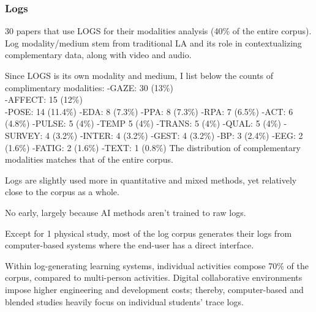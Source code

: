 \documentclass[manuscript,screen,review]{acmart}
\begin{document}
\subsubsection{Logs}
30 papers that use LOGS for their modalities analysis (40\% of the entire corpus). Log modality/medium stem from traditional LA and its role in contextualizing complementary data, along with video and audio.

Since LOGS is its own modality and medium, I list below the counts of complimentary modalities:
-GAZE: 30 (13\%)\\
-AFFECT: 15 (12\%)\\
-POSE: 14 (11.4\%)
-EDA: 8 (7.3\%)
-PPA: 8 (7.3\%)
-RPA: 7 (6.5\%)
-ACT: 6 (4.8\%)
-PULSE: 5 (4\%)
-TEMP 5 (4\%)
-TRANS: 5 (4\%)
-QUAL: 5 (4\%)
-SURVEY: 4 (3.2\%)
-INTER: 4 (3.2\%)
-GEST: 4 (3.2\%)
-BP: 3 (2.4\%)
-EEG: 2 (1.6\%)
-FATIG: 2 (1.6\%)
-TEXT: 1 (0.8\%)
The distribution of complementary modalities matches that of the entire corpus.

Logs are slightly used more in quantitative and mixed methods, yet relatively close to the corpus as a whole.

No early, largely because AI methods aren't trained to raw logs.

Except for 1 physical study, most of the log corpus generates their logs from computer-based systems where the end-user has a direct interface. 

Within log-generating learning systems, individual activities compose 70\% of the corpus, compared to multi-person activities. Digital collaborative environments impose higher engineering and development costs; thereby, computer-based and blended studies heavily focus on individual students' trace logs.
\end{document}
